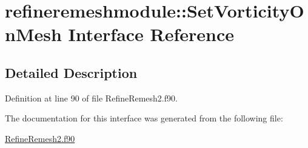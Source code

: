 \hypertarget{interfacerefineremeshmodule_1_1SetVorticityOnMesh}{\section{refineremeshmodule\+:\+:Set\+Vorticity\+On\+Mesh Interface Reference}
\label{interfacerefineremeshmodule_1_1SetVorticityOnMesh}
}


\subsection{Detailed Description}


Definition at line 90 of file Refine\+Remesh2.\+f90.



The documentation for this interface was generated from the following file\+:\begin{DoxyCompactItemize}
\item 
\hyperlink{RefineRemesh2_8f90}{Refine\+Remesh2.\+f90}\end{DoxyCompactItemize}
